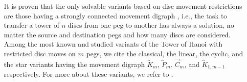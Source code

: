 \documentclass[letterpaper,11pt]{article}
\begin{document}
It is proven that the only solvable variants based on disc movement restrictions are those having a strongly connected movement digraph \cite[Proposition 8.4]{hinz2018tower}, i.e., the task to transfer a  tower of $n$ discs from one peg to another has always a  solution, no matter the source and destination pegs and how many discs are considered. Among the most known and studied variants of the Tower of Hanoi with restricted disc moves on $m$ pegs, we cite the classical, the linear, the cyclic, and the star variants having the movement digraph $\overleftrightarrow{K}_{m}$, $\overleftrightarrow{P}_{m}$, $\overrightarrow{C}_{m}$, and $\overleftrightarrow{K}_{1,m-1}$ respectively. For more about these variants, we refer to \cite{hinz2022dudeney,sapir2004tower,stockmeyer1994variations,atkinson1981cyclic,berend2006cyclic, allouche2005restricted,berend2012tower}.
\end{document}
